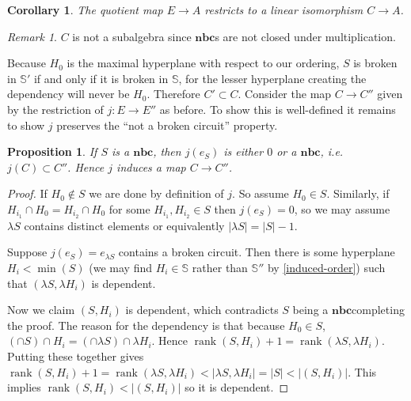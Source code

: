 \documentclass[article,twoside]{article}
\newcommand{\BB}[1]{\mathbb{#1}}
\newcommand{\rk}{\operatorname{rank}}
\newcommand{\tuples}{\BB{S}}
\newcommand{\NBC}{$\textbf{nbc}$}
\theoremstyle{plain}
\theoremstyle{plain}
\theoremstyle{plain}
\newtheorem{proposition}[proposition]{Proposition}
\theoremstyle{plain}
\newtheorem{corollary}[corollary]{Corollary}
\theoremstyle{plain}
\theoremstyle{definition}
\theoremstyle{definition}
\theoremstyle{definition}
\theoremstyle{remark}
\theoremstyle{remark}
\newtheorem{remark}[remark]{Remark}
\begin{document}
\begin{corollary}\label{circuit_OS_iso}
	The quotient map $E\to A$ restricts to a linear isomorphism $C\to A$.
\end{corollary}

\begin{remark}
	$C$ is not a subalgebra since \NBC s are not closed under multiplication.
\end{remark}

Because $H_0$ is the maximal hyperplane with respect to our ordering, $S$ is broken in $\tuples'$ if and only if it is broken in $\tuples$, for the lesser hyperplane creating the dependency will never be $H_0$. Therefore $C'\subset C$. Consider the map $C\to C''$ given by the restriction of $j:E\to E''$ as before. To show this is well-defined it remains to show $j$ preserves the ``not a broken circuit'' property.






\begin{proposition}
	If $S$ is a \NBC, then $j(e_S)$ is either $0$ or a \NBC, i.e. $j(C)\subset C''$. Hence $j$ induces a map $C\to C''$.
\end{proposition}
\begin{proof}
	If $H_0\notin S$ we are done by definition of $j$. So assume $H_0\in S$. Similarly, if $H_{i_1}\cap H_0 = H_{i_2}\cap H_0$ for some $H_{i_1},H_{i_2}\in S$ then $j(e_S)=0$, so we may assume $\lambda S$ contains distinct elements or equivalently $|\lambda S| = |S|-1$.

	Suppose $j(e_S)=e_{\lambda S}$ contains a broken circuit. Then there is some hyperplane $H_{i}<\min(S)$ (we may find $H_i\in\tuples$ rather than $\tuples''$ by \autoref{induced-order}) such that $(\lambda S,\lambda H_{i})$ is dependent.
	
	Now we claim $(S,H_i)$ is dependent, which contradicts $S$ being a \NBC completing the proof. The reason for the dependency is that because $H_0\in S$, $(\cap S)\cap H_i = (\cap \lambda S)\cap \lambda H_i$. Hence $\rk(S,H_i)+1 = \rk(\lambda S,\lambda H_i)$. Putting these together gives $\rk(S,H_i)+1 = \rk(\lambda S,\lambda H_i) < |\lambda S,\lambda H_i| = |S| < |(S,H_i)|$. This implies $\rk(S,H_i)<|(S,H_i)|$ so it is dependent.
\end{proof}
\end{document}

